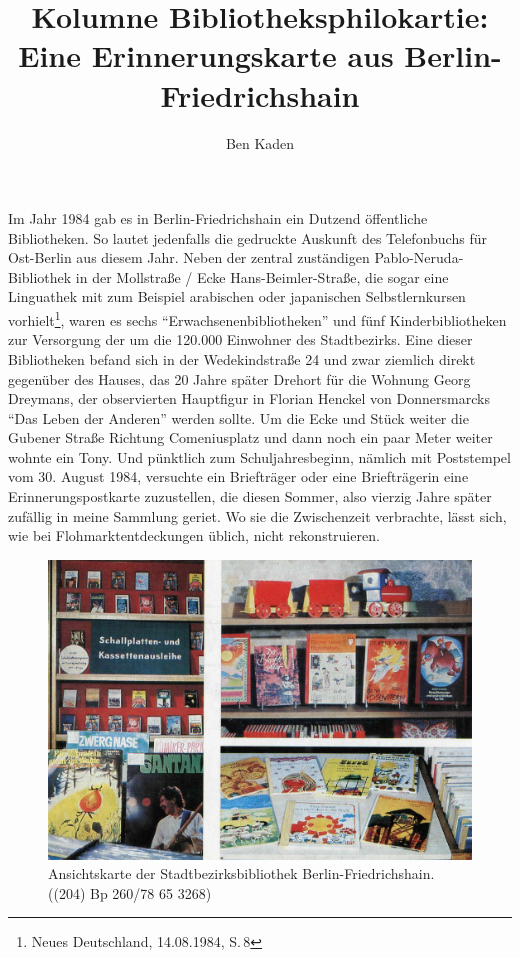\documentclass[a4paper,
fontsize=11pt,
oneside,
numbers=noperiodatend,
parskip=half-,
bibliography=totoc,
final
]{scrartcl}
\title{\LARGE{Kolumne Bibliotheksphilokartie: Eine Erinnerungskarte aus Berlin-Friedrichshain}}%
\author{Ben Kaden} %
\date{}
\begin{document}
\maketitle
\thispagestyle{fancyplain} 


Im Jahr 1984 gab es in Berlin-Friedrichshain ein Dutzend öffentliche
Bibliotheken. So lautet jedenfalls die gedruckte Auskunft des
Telefonbuchs für Ost-Berlin aus diesem Jahr. Neben der zentral
zuständigen Pablo-Neruda-Bibliothek in der Mollstraße / Ecke
Hans-Beimler-Straße, die sogar eine Linguathek mit zum Beispiel
arabischen oder japanischen Selbstlernkursen vorhielt\footnote{Neues
  Deutschland, 14.08.1984, S.\,8}, waren es sechs
\enquote{Erwachsenenbibliotheken} und fünf Kinderbibliotheken zur
Versorgung der um die 120.000 Einwohner des Stadtbezirks. Eine dieser
Bibliotheken befand sich in der Wedekindstraße 24 und zwar ziemlich
direkt gegenüber des Hauses, das 20 Jahre später Drehort für die Wohnung
Georg Dreymans, der observierten Hauptfigur in Florian Henckel von
Donnersmarcks \enquote{Das Leben der Anderen} werden sollte. Um die Ecke
und Stück weiter die Gubener Straße Richtung Comeniusplatz und dann noch
ein paar Meter weiter wohnte ein Tony. Und pünktlich zum
Schuljahresbeginn, nämlich mit Poststempel vom 30. August 1984,
versuchte ein Briefträger oder eine Briefträgerin eine
Erinnerungspostkarte zuzustellen, die diesen Sommer, also vierzig Jahre
später zufällig in meine Sammlung geriet. Wo sie die Zwischenzeit
verbrachte, lässt sich, wie bei Flohmarktentdeckungen üblich, nicht
rekonstruieren.

\begin{figure}
\centering
\includegraphics{img/abb1.jpg}
\caption{Ansichtskarte der Stadtbezirksbibliothek Berlin-Friedrichshain.
((204) Bp 260/78 65 3268)}
\end{figure}
\end{document}
